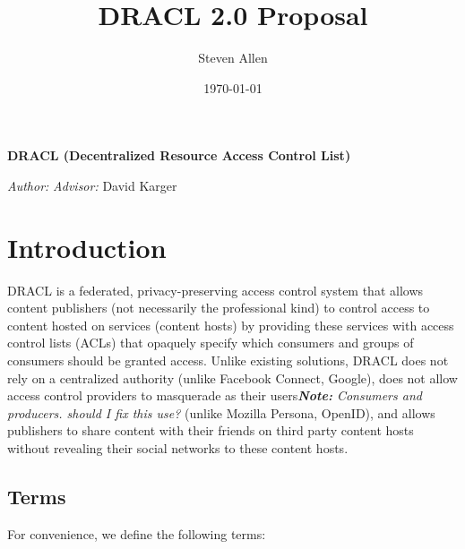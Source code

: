 \documentclass[pdftex,12pt,a4papaer]{report}
\title{DRACL 2.0 Proposal}
\author{Steven Allen}
\date{\today}
\newcommand{\note}[1]{\textit{\textbf{Note:} #1}}
\begin{document}
\thispagestyle{plain}

\begin{center}
    \vspace*{\fill}
    {%
        \onehalfspacing{} \bfseries \Large
        DRACL (Decentralized Resource Access Control List) \\
    }

    \vspace{\fill}
    {\large
    \begin{minipage}{0.9\textwidth}
        \emph{Author:} \theauthor{} \hfill \emph{Advisor:} David Karger
        \\
        \begin{center}
              \thedate{}
        \end{center}
    \end{minipage}
    }
    \vspace*{\fill}
\end{center}

\tableofcontents

\newpage

\chapter{Introduction} 

DRACL is a federated, privacy-preserving access control system that allows
content publishers (not necessarily the professional kind) to control access to
content hosted on services (content hosts) by providing these services with
access control lists (ACLs) that opaquely specify which consumers and groups of
consumers should be granted access. Unlike existing solutions, DRACL does not
rely on a centralized authority (unlike Facebook Connect, Google), does not
allow access control providers to masquerade as their users\note{Consumers and
  producers. should I fix this use?} (unlike Mozilla
Persona, OpenID), and allows publishers to share content with their friends on
third party content hosts without revealing their social networks to these
content hosts.

\section{Terms}

For convenience, we define the following terms:
\end{document}
